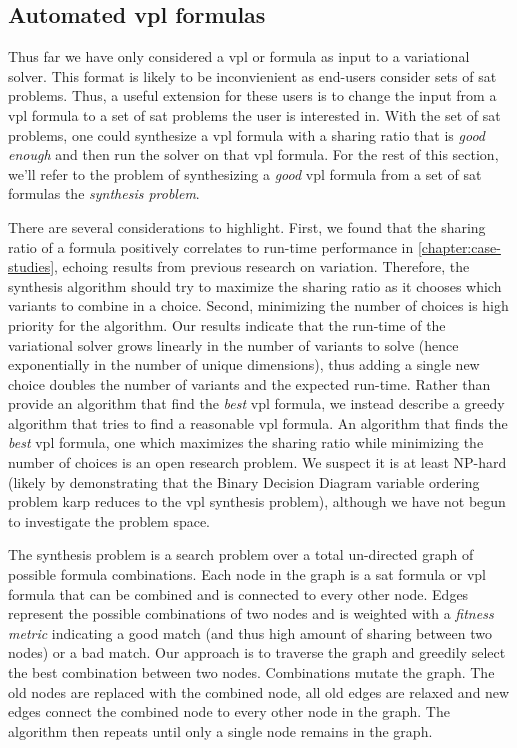 \subsection{Automated \ac{vpl} formulas}
Thus far we have only considered a \ac{vpl} or \evpl{} formula as input to a
variational solver. This format is likely to be inconvienient as end-users
consider sets of \ac{sat} problems. Thus, a useful extension for these users is
to change the input from a \ac{vpl} formula to a set of \ac{sat} problems the
user is interested in. With the set of \ac{sat} problems, one could synthesize a
\ac{vpl} formula with a sharing ratio that is \emph{good enough} and then run
the solver on that \ac{vpl} formula. For the rest of this section, we'll refer
to the problem of synthesizing a \emph{good} \ac{vpl} formula from a set of
\ac{sat} formulas the \emph{synthesis problem}.

There are several considerations to highlight. First, we found that the sharing
ratio of a formula positively correlates to run-time performance in
\autoref{chapter:case-studies}, echoing results from previous research on
variation. Therefore, the synthesis algorithm should try to maximize the sharing
ratio as it chooses which variants to combine in a choice. Second, minimizing
the number of choices is high priority for the algorithm. Our results indicate
that the run-time of the variational solver grows linearly in the number of
variants to solve (hence exponentially in the number of unique dimensions), thus
adding a single new choice doubles the number of variants and the expected
run-time. Rather than provide an algorithm that find the \emph{best} \ac{vpl}
formula, we instead describe a greedy algorithm that tries to find a reasonable
\ac{vpl} formula. An algorithm that finds the \emph{best} \ac{vpl} formula,
\eg{} one which maximizes the sharing ratio while minimizing the number of
choices is an open research problem. We suspect it is at least NP-hard (likely
by demonstrating that the Binary Decision Diagram variable ordering problem karp
reduces to the \ac{vpl} synthesis problem), although we have not begun to
investigate the problem space.

The synthesis problem is a search problem over a total un-directed graph of
possible formula combinations. Each node in the graph is a \ac{sat} formula or
\ac{vpl} formula that can be combined and is connected to every other node.
Edges represent the possible combinations of two nodes and is weighted with a
\emph{fitness metric} indicating a good match (and thus high amount of sharing
between two nodes) or a bad match. Our approach is to traverse the graph and
greedily select the best combination between two nodes. Combinations mutate the
graph. The old nodes are replaced with the combined node, all old edges are
relaxed and new edges connect the combined node to every other node in the
graph. The algorithm then repeats until only a single node remains in the graph.

